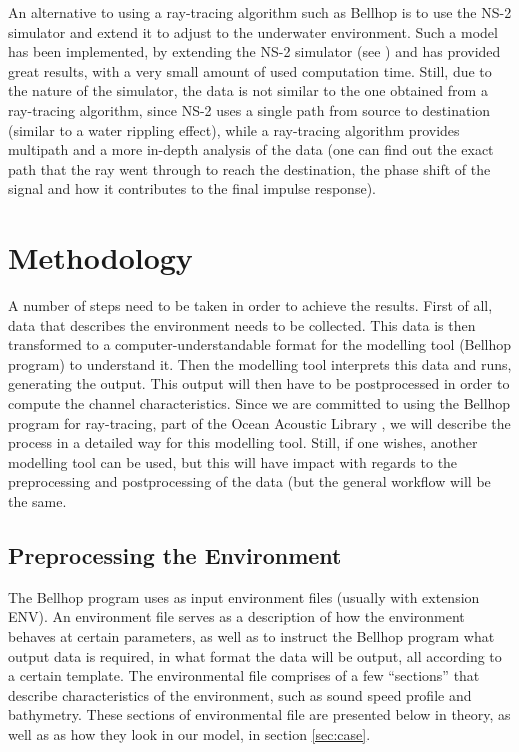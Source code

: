 \documentclass[a4paper]{IEEEtran}
\begin{document}
An alternative to using a ray-tracing algorithm such as Bellhop is to use the
NS-2 simulator and extend it to adjust to the underwater environment. Such a
model has been implemented, by extending the NS-2 simulator (see \cite{ns2}) and
has provided great results, with a very small amount of used computation time.
Still, due to the nature of the simulator, the data is not similar to the one
obtained from a ray-tracing algorithm, since NS-2 uses a single path from source
to destination (similar to a water rippling effect), while a ray-tracing
algorithm provides multipath and a more in-depth analysis of the data (one can
find out the exact path that the ray went through to reach the destination, the
phase shift of the signal and how it contributes to the final impulse response).

\section{Methodology}
A number of steps need to be taken in order to achieve the results. First of
all, data that describes the environment needs to be collected. This data is
then transformed to a computer-understandable format for the modelling tool
(Bellhop program) to understand it. Then the modelling tool interprets this data
and runs, generating the output. This output will then have to be postprocessed
in order to compute the channel characteristics. Since we are committed to using
the Bellhop program for ray-tracing, part of the Ocean Acoustic Library
\cite{oal}, we will describe the process in a detailed way for this modelling
tool. Still, if one wishes, another modelling tool can be used, but this will
have impact with regards to the preprocessing and postprocessing of the data
(but the general workflow will be the same.

\subsection{Preprocessing the Environment}

The Bellhop program uses as input environment files (usually with extension
ENV). An environment file serves as a description of how the environment behaves
at certain parameters, as well as to instruct the Bellhop program what output
data is required, in what format the data will be output, all according to a
certain template. The environmental file comprises of a few ``sections'' that
describe characteristics of the environment, such as sound speed profile and
bathymetry. These sections of environmental file are presented below in theory,
as well as as how they look in our model, in section \ref{sec:case}.
\end{document}
